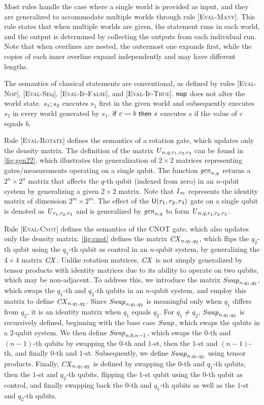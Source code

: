 Most rules handle the case where a single world is provided as input, and they
are generalized to accommodate multiple worlds through rule
	[\textsc{Eval-Many}].
%
This rule states that when multiple worlds are given, the statement runs in
each world, and the output is determined by collecting the outputs from each
individual run.
%
Note that when overlines are nested, the outermost one expands first, while the
copies of each inner overline expand independently and may have different
lengths.

The semantics of classical statements are conventional, as defined by rules
	[\textsc{Eval-Nop}], [\textsc{Eval-Seq}], [\textsc{Eval-If-False}], and
	[\textsc{Eval-If-True}].
%
$\mathsf{nop}$ does not alter the world state.
%
$s_1;s_2$ executes $s_1$ first in the given world and subsequently
executes $s_2$ in every world generated by $s_1$.
%
$\mathsf{if}\ c\rightsquigarrow b\ \mathsf{then}\ s$ executes $s$ if the value of $c$ equals $b$.

Rule [\textsc{Eval-Rotate}] defines the semantics of a rotation gate, which
updates only the density matrix.
%
The definition of the matrix $\mbox{\emph{U}}_{n,q,r_1,r_2,r_3}$ can be found in
\cref{fig:gen22}, which illustrates the generalization of $2\times2$ matrices
representing gates/measurements operating on a single qubit.
%
The function $\mbox{\emph{gen}}_{n,q}$ returns a $2^n\times2^n$ matrix that affects
the $q$-th qubit (indexed from zero) in an $n$-qubit system by generalizing a
given $2\times2$ matrix.
%
Note that $\mbox{\emph{I}}_{m}$ represents the identity matrix of dimension
$2^m\times2^m$.
%
The effect of the $\mathsf{U}(r_1,r_2,r_3)$ gate on a single qubit is denoted as
$\mbox{\emph{U}}_{r_1,r_2,r_3}$ and is generalized by $\mbox{\emph{gen}}_{n,q}$ to form
$\mbox{\emph{U}}_{n,q,r_1,r_2,r_3}$.

Rule [\textsc{Eval-Cnot}] defines the semantics of the CNOT gate, which also
updates only the density matrix.
%
\cref{fig:cnot} defines the matrix $\mbox{\emph{CX}}_{n,q_1,q_2}$, which flips the
$q_2$-th qubit using the $q_1$-th qubit as control in an $n$-qubit system, by
generalizing the $4\times4$ matrix $\mbox{\emph{CX}}_{}$.
%
Unlike rotation matrices, $\mbox{\emph{CX}}_{}$ is not simply generalized by tensor
products with identity matrices due to its ability to operate on two qubits,
which may be non-adjacent.
%
To address this, we introduce the matrix $\mbox{\emph{Swap}}_{n,q_1,q_2}$, which swaps the
$q_1$-th and $q_2$-th qubits in an $n$-qubit system, and employ this matrix to
define $\mbox{\emph{CX}}_{n,q_1,q_2}$.
%
Since $\mbox{\emph{Swap}}_{n,q_1,q_2}$ is meaningful only when $q_1$ differs from $q_2$, it
is an identity matrix when $q_1$ equals $q_2$.
%
For $q_1\not=q_2$, $\mbox{\emph{Swap}}_{n,q_1,q_2}$ is recursively defined, beginning with
the base case $\mbox{\emph{Swap}}_{}$, which swaps the qubits in a $2$-qubit system.
%
We then define $\mbox{\emph{Swap}}_{n,0,n-1}$, which swaps the $0$-th and $(n-1)$-th qubits
by swapping the $0$-th and $1$-st, then the $1$-st and $(n-1)$-th, and finally
$0$-th and $1$-st.
%
Subsequently, we define $\mbox{\emph{Swap}}_{n,q_1,q_2}$ using tensor products.
%
Finally, $\mbox{\emph{CX}}_{n,q_1,q_2}$ is defined by swapping the $0$-th and $q_1$-th
qubits, then the $1$-st and $q_2$-th qubits, flipping the $1$-st qubit using
the $0$-th qubit as control, and finally swapping back the $0$-th and $q_1$-th
qubits as well as the $1$-st and $q_2$-th qubits.

